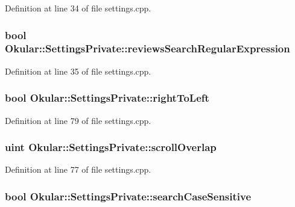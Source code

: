 Definition at line 34 of file settings.\+cpp.

\hypertarget{classOkular_1_1SettingsPrivate_a9d9e9251e0bf18a0bdc3ca726c884012}{
\subsubsection[{reviews\+Search\+Regular\+Expression}]{\setlength{\rightskip}{0pt plus 5cm}bool Okular\+::\+Settings\+Private\+::reviews\+Search\+Regular\+Expression}}\label{classOkular_1_1SettingsPrivate_a9d9e9251e0bf18a0bdc3ca726c884012}


Definition at line 35 of file settings.\+cpp.

\hypertarget{classOkular_1_1SettingsPrivate_ae3b7277848df4610de3f8a05d737cbf8}{
\subsubsection[{right\+To\+Left}]{\setlength{\rightskip}{0pt plus 5cm}bool Okular\+::\+Settings\+Private\+::right\+To\+Left}}\label{classOkular_1_1SettingsPrivate_ae3b7277848df4610de3f8a05d737cbf8}


Definition at line 79 of file settings.\+cpp.

\hypertarget{classOkular_1_1SettingsPrivate_af3c41a275314a6a6e94bfb4bb9bde572}{
\subsubsection[{scroll\+Overlap}]{\setlength{\rightskip}{0pt plus 5cm}uint Okular\+::\+Settings\+Private\+::scroll\+Overlap}}\label{classOkular_1_1SettingsPrivate_af3c41a275314a6a6e94bfb4bb9bde572}


Definition at line 77 of file settings.\+cpp.

\hypertarget{classOkular_1_1SettingsPrivate_a8efa1f3ff95b35de3918e7d50c65af13}{
\subsubsection[{search\+Case\+Sensitive}]{\setlength{\rightskip}{0pt plus 5cm}bool Okular\+::\+Settings\+Private\+::search\+Case\+Sensitive}}\label{classOkular_1_1SettingsPrivate_a8efa1f3ff95b35de3918e7d50c65af13}


